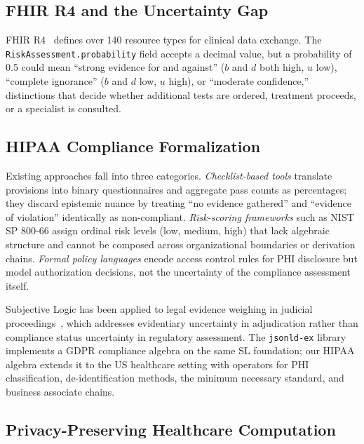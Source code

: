 \documentclass[conference]{IEEEtran}
\begin{document}
\subsection{FHIR R4 and the Uncertainty Gap}

FHIR R4~\cite{hl7fhirr4} defines over 140 resource types for clinical data exchange. The \texttt{RiskAssessment.probability} field accepts a decimal value, but a probability of 0.5 could mean ``strong evidence for and against'' ($b$ and $d$ both high, $u$ low), ``complete ignorance'' ($b$ and $d$ low, $u$ high), or ``moderate confidence,'' distinctions that decide whether additional tests are ordered, treatment proceeds, or a specialist is consulted.

\subsection{HIPAA Compliance Formalization}

Existing approaches fall into three categories. \emph{Checklist-based tools} translate provisions into binary questionnaires and aggregate pass counts as percentages; they discard epistemic nuance by treating ``no evidence gathered'' and ``evidence of violation'' identically as non-compliant. \emph{Risk-scoring frameworks} such as NIST SP 800-66 assign ordinal risk levels (low, medium, high) that lack algebraic structure and cannot be composed across organizational boundaries or derivation chains. \emph{Formal policy languages} encode access control rules for PHI disclosure but model authorization decisions, not the uncertainty of the compliance assessment itself.

Subjective Logic has been applied to legal evidence weighing in judicial proceedings~\cite{josang2016subjective}, which addresses evidentiary uncertainty in adjudication rather than compliance status uncertainty in regulatory assessment. The \texttt{jsonld-ex} library~\cite{syed2026jsonldex} implements a GDPR compliance algebra on the same SL foundation; our HIPAA algebra extends it to the US healthcare setting with operators for PHI classification, de-identification methods, the minimum necessary standard, and business associate chains.

\subsection{Privacy-Preserving Healthcare Computation}
\end{document}
